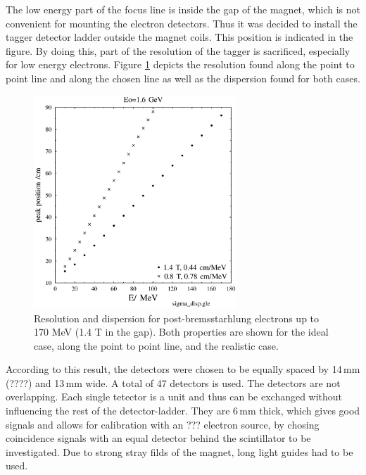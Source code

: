 The low energy part of the focus line is inside the gap of the 
magnet, which is not convenient for mounting the electron detectors.
Thus it was decided to install the tagger detector ladder outside the magnet
coils. This position is indicated in the figure.
By doing this, part of the resolution of the tagger is sacrificed, especially 
for low energy electrons. Figure \ref{resolution} depicts the resolution
found along the point to point line and along the chosen line as well as 
the dispersion found for both cases.\\

\begin{figure}
\begin{center}
\includegraphics[height=8cm]{./et_res_dis.eps}
\vspace*{-1cm}
\end{center}
\caption{Resolution and dispersion for post-bremsstarhlung electrons
up to 170 MeV (1.4 T in the gap). Both properties are shown for the ideal case, 
along the point to point line, and the realistic case.}
\label{resolution}
\end{figure}

According to this result, the detectors were chosen to be equally spaced
by 14\,mm (????)
and 13\,mm wide. A total of 47 detectors is used.
The detectors are not overlapping. 
Each single tetector is a unit and thus can be exchanged without influencing 
the rest of the detector-ladder.
They are 6\,mm thick, which gives good signals and allows for
calibration with an ??? electron source, by chosing coincidence signals with
an equal detector behind the scintillator to be investigated.
Due to strong stray filds of the magnet, long light guides had to be used.

